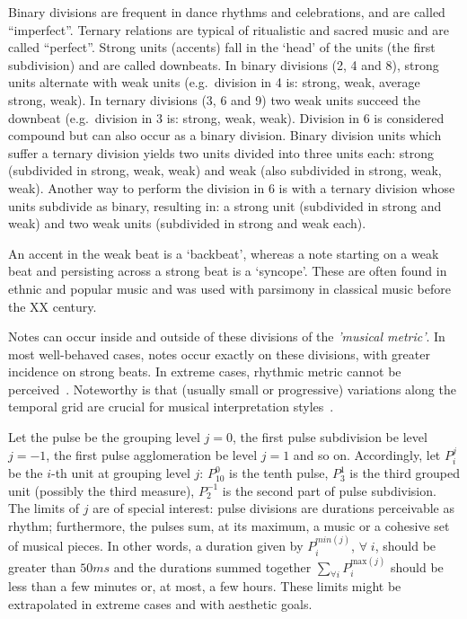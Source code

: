 Binary divisions are frequent in dance rhythms and celebrations, and are called ``imperfect''.
Ternary relations are typical of
ritualistic and sacred music and are called ``perfect''.
Strong units (accents) fall in the `head' of the units (the first subdivision) and are called downbeats. In binary divisions (2, 4
and 8), strong units alternate with weak units
(e.g.\ division in 4 is: strong, weak, average strong, weak). In ternary divisions
(3, 6 and 9) two weak units succeed the downbeat (e.g.\ division in 3 is:
strong, weak, weak). Division in 6 is considered compound but can also
occur as a binary division. Binary division units which suffer a ternary division yields two units divided into three units each: strong (subdivided in strong,
weak, weak) and weak (also subdivided in strong, weak, weak). Another way to perform
the division in 6 is with a ternary division whose units subdivide as binary,
resulting in: a strong unit (subdivided in strong and weak) and two weak units
(subdivided in strong and weak each).

An accent in the weak beat is a `backbeat', whereas a note starting on a weak beat and persisting across a strong beat is a `syncope'.
These are often found in ethnic and popular music and was used with parsimony in classical music before the XX century.

Notes can occur inside and outside of these divisions of the \emph{'musical metric'}. In most well-behaved cases, notes occur exactly on these divisions, with greater incidence on strong beats.
In extreme cases, rhythmic metric cannot be perceived~\cite{Roederer}. 
Noteworthy is that (usually small or progressive) variations along the temporal grid are crucial for musical interpretation
styles~\cite{Cook}.

Let the pulse be the grouping level $j=0$, the first pulse subdivision be level $j=-1$,
the first pulse agglomeration be level $j=1$ and so on. Accordingly, let $P_i^j$ be the $i$-th unit at grouping level $j$: $P^0_{10}$ is the tenth pulse, $P^{1}_3$ is the third grouped unit (possibly the third measure),
$P^{-1}_2$ is the second part of pulse subdivision. The limits of $j$ are of special interest: pulse divisions are durations perceivable as rhythm; furthermore, the pulses sum, at its maximum, a music or a cohesive set of musical pieces. In other words, a duration given
by $P^{min(j)}_i$, $\forall \; i$, should be greater than $50 ms$ and the durations
summed together $\sum_{\forall i}P^{\text{max}(j)}_i$ should be less than a few
minutes or, at most, a few hours.
These limits might be extrapolated in extreme cases and with aesthetic goals.

